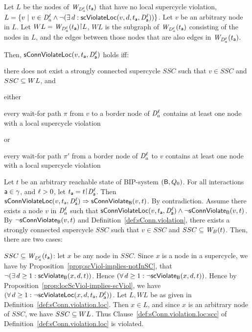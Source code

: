 Let $L$ be the nodes of $\mathit{W}_{\mathit{D}_{a}^{\ell}}({t_{\mathsf{a}}})$ that have no local
supercycle violation, \ie $L = \{ v ~|~ v \in \mathit{D}_{a}^{\ell} \land \neg (\exists\, d: \mathsf{scViolateLoc}(v,d,t_{\mathsf{a}},\mathit{D}_{\mathsf{a}}^{\ell}))  \}$.
Let $v$ be an arbitrary node in $L$. 
Let $WL = \wfg{\dsk{a}{\l}}{t_\act} \pj L$, \ie $WL$ is the subgraph of $\mathit{W}_{\mathit{D}_{a}^{\ell}}({t_{\mathsf{a}}})$ consisting of the
nodes in $L$, and the edges between those nodes that are also edges in $\mathit{W}_{\mathit{D}_{a}^{\ell}}({t_{\mathsf{a}}})$.

Then, $\mathsf{sConnViolateLoc}(v,t_{\mathsf{a}},\mathit{D}_{\mathsf{a}}^{\ell})$ holds iff:
\bn

\item \label{def:sConn.violation.loc:scc}
there does not exist a strongly connected supercycle $SSC$ such that $v \in SSC$ and $SSC \subseteq WL$, and


\item \label{def:sConn.violation.border}
either
    \bn

    \item \label{def:sConn.violation.loc:wait-for-out} every wait-for path $\pi$ from $v$ to a border node
      of $\mathit{D}_{a}^{\ell}$ contains at least one node with a local supercycle violation

     or

    \item \label{def:sConn.violation.loc:wait-for-in} every wait-for path $\pi'$ from a border node
      of $\mathit{D}_{a}^{\ell}$ to $v$ contains at least one node with a local supercycle violation

    \en

\en
\ed



\bp
\label{prop:locConnViol-implies-ConnViol}
 \label{prop:locConnViol-implies-connViol}
Let $t$ be an arbitrary reachable state of BIP-system $(\mathsf{B}, Q_0)$.
For all interactions $\mathsf{a} \in \gamma$, and $\ell > 0$, let $t_\act = t \pj \dsk{\act}{\l}$.
Then\\
\ind $\mathsf{sConnViolateLoc}(v,t_{\mathsf{a}},\mathit{D}_{\mathsf{a}}^{\ell}) \Rightarrow \mathsf{sConnViolate}_{\mathsf{B}}(v,t)$.
\ep
%
\bpr
By contradiction. Assume there exists a node $v$ in $\mathit{D}_{a}^{\ell}$ such that $\mathsf{sConnViolateLoc}(v,t_{\mathsf{a}},\mathit{D}_{\mathsf{a}}^{\ell}) \land \neg \mathsf{sConnViolate}_{\mathsf{B}}(v,t)$.
By $\neg \mathsf{sConnViolate}_{\mathsf{B}}(v,t)$ and Definition~\ref{def:sConn.violation}, there exists a strongly connected
supercycle $SSC$ such that $v \in SSC$ and $SSC \subseteq \mathit{W}_{B}({t})$. Then, there are two cases:
%
\bn
\item $SSC \subseteq \mathit{W}_{\mathit{D}_{a}^{\ell}}({t_{\mathsf{a}}})$: let $x$ be any node in $SSC$. Since $x$ is a node in a supercycle, we have by
  Proposition~\ref{prop:scViol-implies-notInSC}, that $\neg (\exists\, d \ge 1: \mathsf{scViolate}_{\mathsf{B}}(x,d,t))$. Hence 
  $(\forall\, d \ge 1: \neg \mathsf{scViolate}_{\mathsf{B}}(x,d,t))$. Hence by Proposition~\ref{prop:locScViol-implies-scViol}, 
  we have $(\forall\, d \ge 1: \neg \mathsf{scViolateLoc}(x,d,t_{\mathsf{a}},\mathit{D}_{\mathsf{a}}^{\ell}))$. Let $L, WL$ be as given in Definition~\ref{def:sConn.violation.loc}.
  Then $x \in L$, and since $x$ is an arbitrary node of $SSC$, we have $SSC \subseteq WL$. 
  Thus Clause~\ref{def:sConn.violation.loc:scc} of Definition~\ref{def:sConn.violation.loc} is violated.

